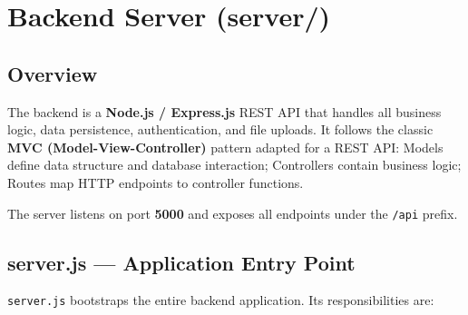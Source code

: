 \documentclass[12pt,a4paper]{report}
\begin{document}
\chapter{Backend Server (server/)}

\section{Overview}

The backend is a \textbf{Node.js / Express.js} REST API that handles all business logic, data persistence, authentication, and file uploads. It follows the classic \textbf{MVC (Model-View-Controller)} pattern adapted for a REST API: Models define data structure and database interaction; Controllers contain business logic; Routes map HTTP endpoints to controller functions.

The server listens on port \textbf{5000} and exposes all endpoints under the \texttt{/api} prefix.

\section{server.js --- Application Entry Point}

\texttt{server.js} bootstraps the entire backend application. Its responsibilities are:
\end{document}
